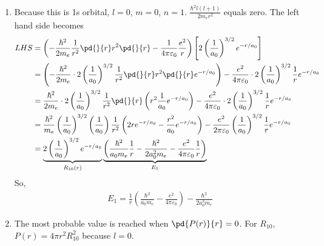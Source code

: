 \begin{solution}\
    \begin{enumerate}
        \item Because this is 1s orbital, $l=0$, $m=0$, $n=1$. $\frac{\hbar^2l(l+1)}{2m_er^2}$ equals zero. The left hand side becomes
              \begin{align*}
                  LHS & = \left(-\frac{\hbar^{2}}{2 m_{e}}\frac{1}{r^{2}}\pd{}{r}r^{2}\pd{}{r}-\frac{1}{4\pi\varepsilon_{0}}
                  \frac{e^{2}}{r}\right)\left[2\left(\frac{1}{a_{0}}\right)^{3/2}e^{-r/a_{0}}\right]                                                                  \\
                      & =\left(-\frac{\hbar^{2}}{2 m_{e}}\cdot2\left(\frac{1}{a_{0}}\right)^{3/2}\frac{1}{r^{2}}\pd{}{r}r^{2}\pd{}{r}e^{-r/a_{0}}\right)-\frac{e^{2}}
                  {4\pi\varepsilon_{0}}\cdot2\left(\frac{1}{a_0}\right)^{3/2}\frac{1}{r}e^{-r/a_{0}}                                                                  \\
                      & =\frac{\hbar^{2}}{2m_e}\cdot2\left(\frac{1}{a_{0}}\right)^{3/2}\frac{1}{r^{2}}\pd{}{r}\left(r^{2}\frac{1}{a_{0}} e^{-r/a_{0}}\right)
                  -\frac{e^{2}}{4\pi\varepsilon_{0}}\cdot2\left(\frac{1}{a_{0}}\right)^{3/2}\frac{1}{r}e^{-r/a_{0}}                                                   \\
                      & =\frac{\hbar^{2}}{m_{e}}\left(\frac{1}{a_{0}}\right)^{3/2}\left(\frac{1}{a_{0}}\right)\frac{1}{r^{2}}\left(2re^{-r/a_{0}}-
                  \frac{r^{2}}{a_{0}} e^{-r/a_{0}}\right)-\frac{e^{2}}{2\pi\varepsilon_{0}}\left(\frac{1}{a_{0}}\right)^{3/2}\frac{1}{r}e^{-r/a_{0}}                  \\
                      & =\underbrace{2\left(\frac{1}{a_{0}}\right)^{3/2}e^{-r/a_{0}}}_{R_{10}(r)}
                  \underbrace{\left(\frac{\hbar^{2}}{a_{0}m_{e}}\frac{1}{r}-\frac{\hbar^{2}}{2a_{0}^{2}m_{e}}-\frac{e^{2}}{4\pi\varepsilon_{0}}\frac{1}{r}\right)}_{E_1}
              \end{align*}
              So,
              \begin{align*}
                  E_1=\frac{1}{r}\left(\frac{\hbar^{2}}{a_{0}m_{e}}-\frac{e^{2}}{4\pi\varepsilon_{0}}\right)-\frac{\hbar^{2}}{2a_{0}^{2} m_{e}}
              \end{align*}
        \item The most probable value is reached when $\pd{P(r)}{r}=0$. For $R_{10}$, $P(r)=4\pi r^{2}R_{10}^{2}$ because $l=0$.
              \begin{align*}

\end{align*}
\end{enumerate}
\end{solution}
